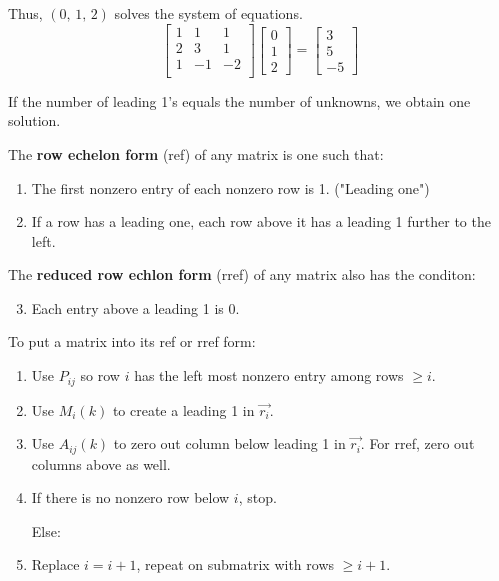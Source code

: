 \documentclass[../main.tex]{subfiles}
\begin{document}
\begin{example}[]
    Thus, \( (0, \, 1, \, 2) \) solves the system of equations.
    \[
        \begin{bmatrix}
            1 & 1 & 1 \\
            2 & 3 & 1 \\
            1 & -1 & -2 \\
        \end{bmatrix}
        \begin{bmatrix}
            0 \\
            1 \\
            2
        \end{bmatrix}
        =
        \begin{bmatrix}
            3 \\
            5 \\
            -5
        \end{bmatrix}
    \]

    \begin{note}
        If the number of leading 1's equals the number of unknowns, we obtain one solution.
    \end{note}
\end{example}

\begin{definition}
    The \textbf{row echelon form} (ref) of any matrix is one such that:
    \begin{enumerate}[label=(\alph*)]
        \item The first nonzero entry of each nonzero row is 1. ("Leading one")
        \item If a row has a leading one, each row above it has a leading 1 further to the left.
    \end{enumerate}

    The \textbf{reduced row echlon form} (rref) of any matrix also has the conditon:
    \begin{enumerate}[label=(\alph*)]
        \setcounter{enumi}{2}
        \item Each entry above a leading 1 is 0.
    \end{enumerate}
\end{definition}

To put a matrix into its ref or rref form:
\begin{enumerate}
    \item Use \( P_{ij} \) so row \( i \) has the left most nonzero entry among rows \( \geq i \).
    \item Use \( M_i(k) \) to create a leading 1 in \( \vec{r_i} \).
    \item Use \( A_{ij}(k) \) to zero out column below leading 1 in \( \vec{r_i} \).
    For rref, zero out columns above as well.
    \item If there is no nonzero row below \( i \), stop. 

    Else:
    \item Replace \( i=i+1 \), repeat on submatrix with rows \( \geq i+1 \).
\end{enumerate}
\end{document}

